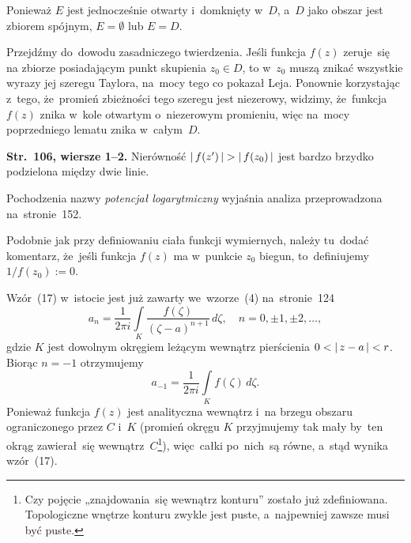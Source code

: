 \documentclass[a4paper,11pt]{article}
\begin{document}
Ponieważ $E$ jest jednocześnie otwarty i~domknięty w~$D$, a~$D$ jako
obszar jest zbiorem spójnym, $E = \emptyset$ lub $E = D$.

Przejdźmy do~dowodu zasadniczego twierdzenia. Jeśli funkcja $f( z )$
zeruje~się na zbiorze posiadającym punkt skupienia $z_{ 0 } \in D$, to
w~$z_{ 0 }$ muszą znikać wszystkie wyrazy jej szeregu Taylora, na~mocy
tego co pokazał Leja. Ponownie korzystając z~tego, że~promień
zbieżności tego szeregu jest niezerowy, widzimy, że~funkcja~$f( z )$
znika w~kole otwartym o~niezerowym promieniu, więc na~mocy
poprzedniego lematu znika w~całym~$D$.

\vspace{\spaceFour}





\noindent
\textbf{Str.~106, wiersze 1--2.} Nierówność
$|\, {  f( z' )  } \,| > |\, {  f( z_{ 0 } )  } \,|$ jest bardzo brzydko
podzielona między dwie linie.

\vspace{\spaceFour}





\noindent
{} Pochodzenia nazwy \textit{potencjał logarytmiczny} wyjaśnia
analiza przeprowadzona na~stronie~152.

\vspace{\spaceFour}





\noindent
{} Podobnie jak przy definiowaniu ciała funkcji wymiernych, należy
tu~dodać komentarz, że~jeśli funkcja $f( z )$ ma w~punkcie $z_{ 0 }$
biegun, to~definiujemy $1 / f( z_{ 0 } ) := 0$.

\vspace{\spaceFour}





\noindent
{} Wzór~(17) w~istocie jest już zawarty we~wzorze~(4) na~stronie~124
\begin{equation}
  \label{eq:Leja-Funkcje-zespolone-46}
  a_{ n } =
  \frac{ 1 }{ 2\pi i }
  \int\limits_{ K } \frac{ f( \zeta ) }{ ( \zeta - a )^{ n + 1 } } \, d\zeta,
  \quad n = 0, \pm 1, \pm 2, \ldots,
\end{equation}
gdzie $K$ jest dowolnym okręgiem leżącym wewnątrz pierścienia
$0 < |\, {  z - a  } \,| < r$. Biorąc $n = -1$ otrzymujemy
\begin{equation}
  \label{eq:Leja-Funkcje-zespolone-47}
  a_{ -1 } = \frac{ 1 }{ 2\pi i } \int\limits_{ K } f( \zeta ) \, d\zeta.
\end{equation}
Ponieważ funkcja $f( z )$ jest analityczna wewnątrz i~na brzegu
obszaru ograniczonego przez $C$ i~$K$ (promień okręgu $K$ przyjmujemy
tak mały by~ten okrąg zawierał~się wewnątrz~$C$\footnote{Czy pojęcie
  „znajdowania~się wewnątrz konturu” zostało już zdefiniowana.
  Topologiczne wnętrze konturu zwykle jest puste, a~najpewniej zawsze
  musi być puste.}), więc~całki po~nich~są równe, a~stąd wynika
wzór~(17).
\end{document}
